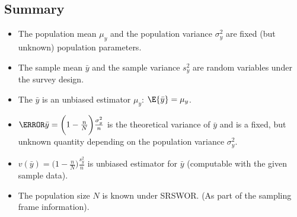 \documentclass[oneside]{book}\usepackage[]{graphicx}\usepackage[svgnames]{xcolor}
\begin{document}
\subsection*{Summary}
\begin{Regular}{}
      \begin{itemize}
            \item The population mean $ \mu_y $ and the population variance
                  $ \sigma_y^2 $ are fixed (but unknown) population parameters.
            \item The sample mean $ \bar{y} $ and the sample variance $ s_y^2 $
                  are random variables under the survey design.
            \item The $ \bar{y} $ is an unbiased estimator $ \mu_y $: $ \E{\bar{y}}=\mu_y $.
            \item $ \V{\bar{y}}=\biggl(1-\frac{n}{N}\biggr)\frac{\sigma_y^2}{n} $
                  is the theoretical variance of $ \bar{y} $ and is a fixed, but unknown
                  quantity depending on the population variance $ \sigma_y^2 $.
            \item $ v(\bar{y})=\biggl(1-\frac{n}{N}\biggr)\frac{s_y^2}{n} $
                  is unbiased estimator for $ \bar{y} $ (computable with the given sample data).
            \item The population size $ N $ is known under SRSWOR\@. (As part of the sampling
                  frame information).
      \end{itemize}
\end{Regular}
\end{document}
